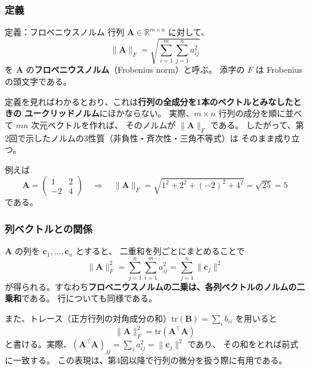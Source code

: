 \subsubsection{定義}

\begin{itembox}[l]{定義：フロベニウスノルム}
行列 $\bm{A} \in \mathbb{R}^{m \times n}$ に対して、
\begin{equation}
  \|\bm{A}\|_F = \sqrt{\sum_{i=1}^{m} \sum_{j=1}^{n} a_{ij}^2}
\end{equation}
を $\bm{A}$ の\textbf{フロベニウスノルム}（Frobenius norm）と呼ぶ。
添字の $F$ は Frobenius の頭文字である。
\end{itembox}

定義を見ればわかるとおり、これは\textbf{行列の全成分を1本のベクトルとみなしたときの
ユークリッドノルム}にほかならない。
実際、$m \times n$ 行列の成分を順に並べて $mn$ 次元ベクトルを作れば、
そのノルムが $\|\bm{A}\|_F$ である。
したがって、第2回で示したノルムの3性質（非負性・斉次性・三角不等式）は
そのまま成り立つ。

例えば
\begin{equation*}
  \bm{A} = \begin{pmatrix} 1 & 2 \\ -2 & 4 \end{pmatrix}
  \quad \Longrightarrow \quad
  \|\bm{A}\|_F = \sqrt{1^2 + 2^2 + (-2)^2 + 4^2} = \sqrt{25} = 5
\end{equation*}
である。

\subsubsection{列ベクトルとの関係}

$\bm{A}$ の列を $\bm{c}_1, \ldots, \bm{c}_n$ とすると、
二重和を列ごとにまとめることで
\begin{equation}
  \|\bm{A}\|_F^2 = \sum_{j=1}^{n} \sum_{i=1}^{m} a_{ij}^2 = \sum_{j=1}^{n} \|\bm{c}_j\|^2
\end{equation}
が得られる。すなわち\textbf{フロベニウスノルムの二乗は、各列ベクトルのノルムの二乗和}である。
行についても同様である。

また、トレース（正方行列の対角成分の和）$\mathrm{tr}(\bm{B}) = \sum_i b_{ii}$ を用いると
\begin{equation}
  \|\bm{A}\|_F^2 = \mathrm{tr}(\bm{A}^\top \bm{A})
\end{equation}
と書ける。実際、$(\bm{A}^\top\bm{A})_{jj} = \sum_i a_{ij}^2 = \|\bm{c}_j\|^2$ であり、
その和をとれば前式に一致する。
この表現は、第4回以降で行列の微分を扱う際に有用である。

